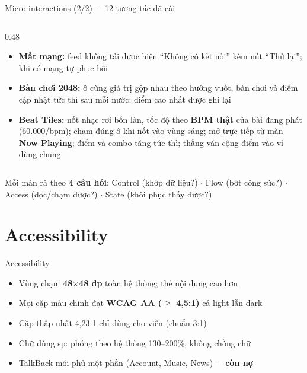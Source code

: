 \documentclass[aspectratio=169]{beamer}
\begin{document}
\begin{frame}{Micro-interactions (2/2)~--~12 tương tác đã cài}
\begin{columns}
\begin{column}{0.48\textwidth}
{\begin{itemize}
        \item \textbf{Mất mạng:} feed không tải được hiện ``Không có kết nối'' kèm nút ``Thử lại''; khi có mạng tự phục hồi
        \item \textbf{Bàn chơi 2048:} ô cùng giá trị gộp nhau theo hướng vuốt, bàn chơi và điểm cập nhật tức thì sau mỗi nước; điểm cao nhất được ghi lại
        \item \textbf{Beat Tiles:} nốt nhạc rơi bốn làn, tốc độ theo \textbf{BPM thật} của bài đang phát (60.000/bpm); chạm đúng ô khi nốt vào vùng sáng; mở trực tiếp từ màn \textbf{Now Playing}; điểm và combo tăng tức thì; thắng ván cộng điểm vào ví dùng chung
      \end{itemize}}
    \end{column}
  \end{columns}
  \vfill
  {\tiny\color{brandgray} Mỗi màn rà theo \textbf{4 câu hỏi}: Control (khớp dữ liệu?) $\cdot$ Flow (bớt công sức?) $\cdot$ Access (đọc/chạm được?) $\cdot$ State (khôi phục thấy được?)}
\end{frame}

\section{Accessibility}
\begin{frame}{Accessibility}
  \begin{itemize}
    \item Vùng chạm \textbf{48$\times$48 dp} toàn hệ thống; thẻ nội dung cao hơn
    \item Mọi cặp màu chính đạt \textbf{WCAG AA ($\geq$ 4,5:1)} cả light lẫn dark
    \item Cặp thấp nhất 4,23:1 chỉ dùng cho viền (chuẩn 3:1)
    \item Chữ dùng sp: phóng theo hệ thống 130--200\%, không chồng chữ
    \item TalkBack mới phủ một phần (Account, Music, News)~--~\textbf{còn nợ}
  \end{itemize}
\end{frame}

\end{document}
